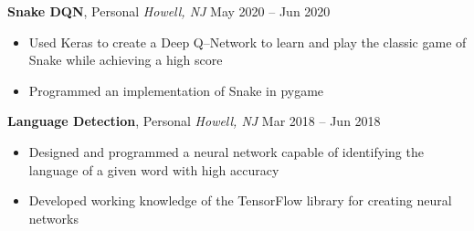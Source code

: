 \documentclass[10pt,letterpaper,roman]{moderncv}
\begin{document}
\hfill

\textbf{Snake DQN}, Personal \textit{Howell, NJ} \hfill May 2020 -- Jun 2020
\begin{itemize}
	\item Used Keras to create a Deep Q--Network to learn and play the classic game of Snake while achieving a high score
	\item Programmed an implementation of Snake in pygame
\end{itemize}

\hfill

\textbf{Language Detection}, Personal \textit{Howell, NJ} \hfill Mar 2018 -- Jun 2018
\begin{itemize}
	\item Designed and programmed a neural network capable of identifying the language of a given word with high accuracy
	\item Developed working knowledge of the TensorFlow library for creating neural networks
\end{itemize}
\end{document}
